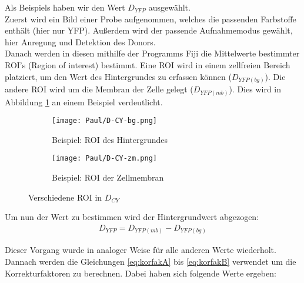 Als Beispiels haben wir den Wert $D_{YFP}$ ausgewählt.\\
Zuerst wird ein Bild einer Probe aufgenommen, welches die passenden Farbstoffe enthält (hier nur YFP). Außerdem wird der passende Aufnahmemodus gewählt, hier Anregung und Detektion des Donors.\\
Danach werden in diesen mithilfe der Programms Fiji die Mittelwerte bestimmter ROI's (Region of interest) bestimmt. Eine ROI wird in einem zellfreien Bereich platziert, um den Wert des Hintergrundes zu erfassen können ($D_{YFP(bg)}$). Die andere ROI wird um die Membran der Zelle gelegt ($D_{YFP(mb)}$). Dies wird in Abbildung \ref{fig:VerschROI} an einem Beispiel verdeutlicht.

\begin{figure}[h]
    \centering
    \begin{subfigure}[]{0.45\textwidth}
        \centering
        \texttt{[image: Paul/D-CY-bg.png]}
        \caption{Beispiel: ROI des Hintergrundes}
    \end{subfigure}
    \hfill 
    \begin{subfigure}[]{0.45\textwidth}
        \centering
        \texttt{[image: Paul/D-CY-zm.png]}
        \caption{Beispiel: ROI der Zellmembran}
    \end{subfigure}
    \caption{Verschiedene ROI in $D_{CY}$}
    \label{fig:VerschROI}
\end{figure}

Um nun der Wert zu bestimmen wird der Hintergrundwert abgezogen: 
\begin{align}
    D_{YFP} = D_{YFP(mb)} - D_{YFP(bg)}
\end{align}

\newpage
Dieser Vorgang wurde in analoger Weise für alle anderen Werte wiederholt. Dannach werden die Gleichungen \ref{eq:korfakA} bis \ref{eq:korfakB} verwendet um die Korrekturfaktoren zu berechnen. Dabei haben sich folgende Werte ergeben: \\


